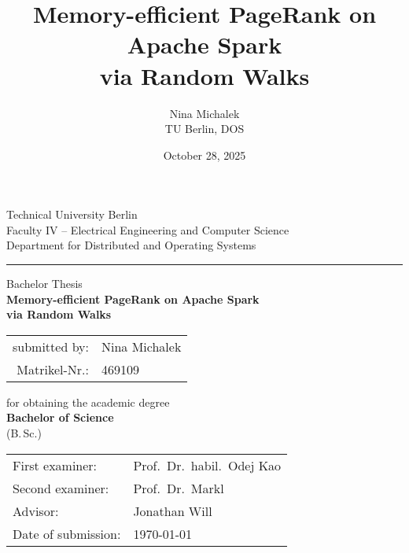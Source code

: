\documentclass[a4paper,12pt]{article}
\title{Memory-efficient PageRank on Apache Spark\\ via Random Walks}
\author{Nina Michalek \\ TU Berlin, DOS}
\date{October 28, 2025}
\begin{document}
\begin{titlepage}
\setlength{\parindent}{0pt}
\vspace{8mm}
{\raggedright
Technical University Berlin\\
Faculty IV -- Electrical Engineering and Computer Science\\
Department for Distributed and Operating Systems\par
}
\vspace{8mm}
\hrule   %
\vspace{10mm}
\vspace{15mm}
\begin{center}
\Large Bachelor Thesis\\[15mm]
\Huge \textbf{Memory-efficient PageRank on Apache Spark\\ via Random Walks}
\end{center}
\vspace{10mm}
\begin{center}
\begin{tabular}{rl}
submitted by: & Nina Michalek \\
Matrikel-Nr.: & 469109 \\
\end{tabular}
\end{center}
\vspace{8mm}
\begin{center}
\onehalfspacing
for obtaining the academic degree \\
\large \textbf{Bachelor of Science} \\
\normalsize (B.\,Sc.)
\end{center}
\vfill
\onehalfspacing
\begin{tabular}{@{}ll}
First examiner: & Prof.\ Dr.\ habil.\ Odej Kao\\
Second examiner: & Prof.\ Dr.\ Markl \\
Advisor: & Jonathan Will\\
Date of submission: & \today
\end{tabular}
\end{titlepage}
\tableofcontents
\newpage
\vspace*{4ex}  %
\end{document}
